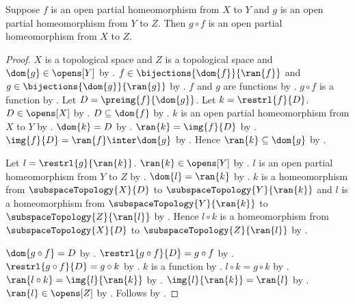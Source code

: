 \begin{theorem}\label{open_partial_homeomorphism_composition}
    Suppose $f$ is an open partial homeomorphism from $X$ to $Y$ and
        $g$ is an open partial homeomorphism from $Y$ to $Z$.
    Then $g\circ f$ is an open partial homeomorphism from $X$ to $Z$.
\end{theorem}
\begin{proof}
    $X$ is a topological space and $Z$ is a topological space and
        $\dom{g}\in\opens[Y]$ by .
    $f\in\bijections{\dom{f}}{\ran{f}}$ and
        $g\in\bijections{\dom{g}}{\ran{g}}$ by
        .
    $f$ and $g$ are functions by .
    $g\circ f$ is a function by .
    Let $D=\preimg{f}{\dom{g}}$.
    Let $k=\restrl{f}{D}$.
    $D\in\opens[X]$ by .
    $D\subseteq\dom{f}$ by .
    $k$ is an open partial homeomorphism from $X$ to $Y$ by
        .
    $\dom{k}=D$ by
        .
    $\ran{k}=\img{f}{D}$ by .
    $\img{f}{D}=\ran{f}\inter\dom{g}$ by
        .
    Hence $\ran{k}\subseteq\dom{g}$ by .

    Let $l=\restrl{g}{\ran{k}}$.
    $\ran{k}\in\opens[Y]$ by .
    $l$ is an open partial homeomorphism from $Y$ to $Z$ by
        .
    $\dom{l}=\ran{k}$ by
        .
    $k$ is a homeomorphism from $\subspaceTopology{X}{D}$ to
        $\subspaceTopology{Y}{\ran{k}}$ and
        $l$ is a homeomorphism from $\subspaceTopology{Y}{\ran{k}}$ to
        $\subspaceTopology{Z}{\ran{l}}$ by
        .
    Hence $l\circ k$ is a homeomorphism from $\subspaceTopology{X}{D}$
        to $\subspaceTopology{Z}{\ran{l}}$ by
        .

    $\dom{g\circ f}=D$ by .
    $\restrl{g\circ f}{D}=g\circ f$ by .
    $\restrl{g\circ f}{D}=g\circ k$ by .
    $k$ is a function by .
    $l\circ k=g\circ k$ by .
    $\ran{l\circ k}=\img{l}{\ran{k}}$ by .
    $\img{l}{\ran{k}}=\ran{l}$ by .
    $\ran{l}\in\opens[Z]$ by .
    Follows by .
\end{proof}

